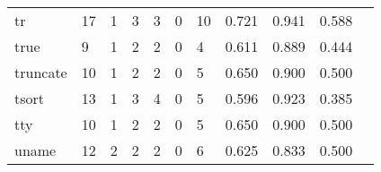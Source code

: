\begin{longtable}{lp{1.2cm}p{1.2cm}p{1.2cm}p{1.2cm}p{1.2cm}p{1.2cm}p{1.2cm}p{1.2cm}p{1.2cm}p{1.2cm}}
tr        &                                    17 &                                                  1 &                                                  3 &                                                  3 &                                                  0 &                                                 10 &                                              0.721 &                                              0.941 &                                              0.588 \\
true      &                                     9 &                                                  1 &                                                  2 &                                                  2 &                                                  0 &                                                  4 &                                              0.611 &                                              0.889 &                                              0.444 \\
truncate  &                                    10 &                                                  1 &                                                  2 &                                                  2 &                                                  0 &                                                  5 &                                              0.650 &                                              0.900 &                                              0.500 \\
tsort     &                                    13 &                                                  1 &                                                  3 &                                                  4 &                                                  0 &                                                  5 &                                              0.596 &                                              0.923 &                                              0.385 \\
tty       &                                    10 &                                                  1 &                                                  2 &                                                  2 &                                                  0 &                                                  5 &                                              0.650 &                                              0.900 &                                              0.500 \\
uname     &                                    12 &                                                  2 &                                                  2 &                                                  2 &                                                  0 &                                                  6 &                                              0.625 &                                              0.833 &                                              0.500 \\

\end{longtable}
